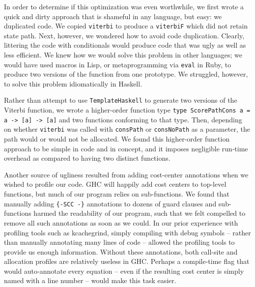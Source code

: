 \documentclass[preprint,nocopyrightspace,times]{sigplanconf}
\begin{document}
In order to determine if this optimization was even worthwhile, we first wrote 
a quick and dirty approach that is shameful in any language, but easy: we 
duplicated code. We copied \texttt{viterbi} to produce a \texttt{viterbiF} 
which did not retain state path. Next, however, we wondered how to avoid code 
duplication. Clearly, littering the code with conditionals would produce code 
that was ugly as well as less efficient. We knew how we would solve this 
problem in other languages; we would have used macros in Lisp, or 
metaprogramming via \texttt{eval} in Ruby, to produce two versions of the 
function from one prototype. We struggled, however, to solve this problem 
idiomatically in Haskell.

Rather than attempt to use \texttt{TemplateHaskell} to generate two versions of 
the Viterbi function, we wrote a higher-order function type 
\lstinline!type ScorePathCons a = a -> [a] -> [a]! and two functions conforming to that type. 
Then, depending on whether \texttt{viterbi} was called with \texttt{consPath} 
or \texttt{consNoPath} as a parameter, the path would or would not be 
allocated. We found this higher-order function approach to be simple in code 
and in concept, and it imposes negligible run-time overhead as compared to 
having two distinct functions.



Another source of ugliness resulted from adding cost-center annotations when we 
wished to profile our code. GHC will happily add cost centers to top-level 
functions, but much of our program relies on sub-functions. We found that 
manually adding \texttt{\{-SCC -\}} annotations to dozens of guard clauses and 
sub-functions harmed the readability of our program, such that we felt 
compelled to remove all such annotations as soon as we could. In our prior 
experience with profiling tools such as kcachegrind, simply compiling with 
debug symbols -- rather than manually annotating many lines of code -- allowed 
the profiling tools to provide us enough information. Without these 
annotations, both call-site and allocation profiles are relatively useless in 
GHC. Perhaps a compile-time flag that would auto-annotate every equation -- 
even if the resulting cost center is simply named with a line number -- would 
make this task easier.
\end{document}
